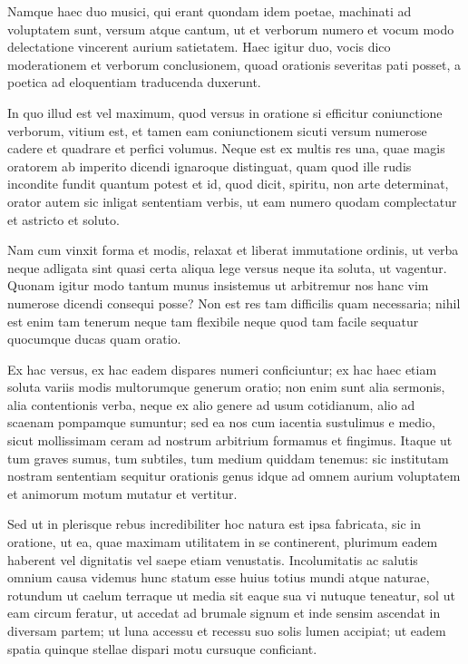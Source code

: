  Namque haec duo musici, qui erant quondam idem poetae, machinati ad voluptatem sunt, versum atque cantum, ut et verborum numero et vocum modo delectatione vincerent aurium satietatem. Haec igitur duo, vocis dico moderationem et verborum conclusionem, quoad orationis severitas pati posset, a poetica ad eloquentiam traducenda duxerunt.

 In quo illud est vel maximum, quod versus in oratione si efficitur coniunctione verborum, vitium est, et tamen eam coniunctionem sicuti versum numerose cadere et quadrare et perfici volumus. Neque est ex multis res una, quae magis oratorem ab imperito dicendi ignaroque distinguat, quam quod ille rudis incondite fundit quantum potest et id, quod dicit, spiritu, non arte determinat, orator autem sic inligat sententiam verbis, ut eam numero quodam complectatur et astricto et soluto.

 Nam cum vinxit forma et modis, relaxat et liberat immutatione ordinis, ut verba neque adligata sint quasi certa aliqua lege versus neque ita soluta, ut vagentur. Quonam igitur modo tantum munus insistemus ut arbitremur nos hanc vim numerose dicendi consequi posse? Non est res tam difficilis quam necessaria; nihil est enim tam tenerum neque tam flexibile neque quod tam facile sequatur quocumque ducas quam oratio.

 Ex hac versus, ex hac eadem dispares numeri conficiuntur; ex hac haec etiam soluta variis modis multorumque generum oratio; non enim sunt alia sermonis, alia contentionis verba, neque ex alio genere ad usum cotidianum, alio ad scaenam pompamque sumuntur; sed ea nos cum iacentia sustulimus e medio, sicut mollissimam ceram ad nostrum arbitrium formamus et fingimus. Itaque ut tum graves sumus, tum subtiles, tum medium quiddam tenemus: sic institutam nostram sententiam sequitur orationis genus idque ad omnem aurium voluptatem et animorum motum mutatur et vertitur.

 Sed ut in plerisque rebus incredibiliter hoc natura est ipsa fabricata, sic in oratione, ut ea, quae maximam utilitatem in se continerent, plurimum eadem haberent vel dignitatis vel saepe etiam venustatis. Incolumitatis ac salutis omnium causa videmus hunc statum esse huius totius mundi atque naturae, rotundum ut caelum terraque ut media sit eaque sua vi nutuque teneatur, sol ut eam circum feratur, ut accedat ad brumale signum et inde sensim ascendat in diversam partem; ut luna accessu et recessu suo solis lumen accipiat; ut eadem spatia quinque stellae dispari motu cursuque conficiant.

